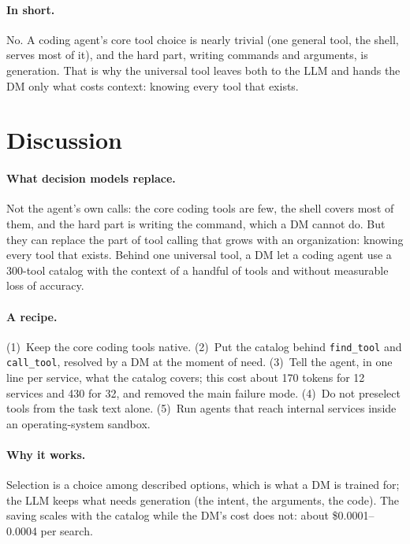\paragraph{In short.} No. A coding agent's core tool choice is nearly trivial (one general tool, the shell,
serves most of it), and the hard part, writing commands and arguments, is generation. That is why the
universal tool leaves both to the LLM and hands the DM only what costs context: knowing every tool that
exists.

\section{Discussion}\label{sec:discussion}

\paragraph{What decision models replace.} Not the agent's own calls: the core
coding tools are few, the shell covers most of them, and the hard part is writing the command, which a DM
cannot do. But they can replace the part of tool calling that grows with an organization: knowing every tool
that exists. Behind one universal tool, a DM let a coding agent use a 300-tool catalog with the context of a
handful of tools and without measurable loss of accuracy.

\paragraph{A recipe.} (1)~Keep the core coding tools native. (2)~Put the catalog behind \texttt{find\_tool} and
\texttt{call\_tool}, resolved by a DM at the moment of need. (3)~Tell the agent, in one line per service, what
the catalog covers; this cost about 170 tokens for 12 services and 430 for 32, and removed the main failure mode. (4)~Do not preselect
tools from the task text alone. (5)~Run agents that reach internal services inside an operating-system
sandbox.

\paragraph{Why it works.} Selection is a choice among described options, which is what a DM is trained for; the
LLM keeps what needs generation (the intent, the arguments, the code). The saving scales with the catalog
while the DM's cost does not: about \$0.0001--0.0004 per search.

